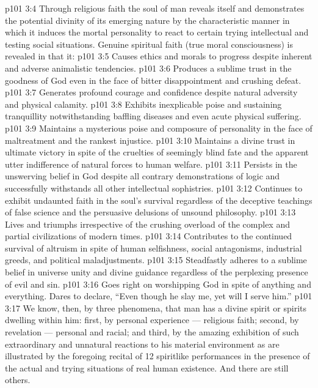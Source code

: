 \vs p101 3:4 Through religious faith the soul of man reveals itself and demonstrates the potential divinity of its emerging nature by the characteristic manner in which it induces the mortal personality to react to certain trying intellectual and testing social situations. Genuine spiritual faith (true moral consciousness) is revealed in that it:
\vs p101 3:5 \bibnobreakspace Causes ethics and morals to progress despite inherent and adverse animalistic tendencies.
\vs p101 3:6 \bibnobreakspace Produces a sublime trust in the goodness of God even in the face of bitter disappointment and crushing defeat.
\vs p101 3:7 \bibnobreakspace Generates profound courage and confidence despite natural adversity and physical calamity.
\vs p101 3:8 \bibnobreakspace Exhibits inexplicable poise and sustaining tranquillity notwithstanding baffling diseases and even acute physical suffering.
\vs p101 3:9 \bibnobreakspace Maintains a mysterious poise and composure of personality in the face of maltreatment and the rankest injustice.
\vs p101 3:10 \bibnobreakspace Maintains a divine trust in ultimate victory in spite of the cruelties of seemingly blind fate and the apparent utter indifference of natural forces to human welfare.
\vs p101 3:11 \bibnobreakspace Persists in the unswerving belief in God despite all contrary demonstrations of logic and successfully withstands all other intellectual sophistries.
\vs p101 3:12 \bibnobreakspace Continues to exhibit undaunted faith in the soul’s survival regardless of the deceptive teachings of false science and the persuasive delusions of unsound philosophy.
\vs p101 3:13 \bibnobreakspace Lives and triumphs irrespective of the crushing overload of the complex and partial civilizations of modern times.
\vs p101 3:14 \bibnobreakspace Contributes to the continued survival of altruism in spite of human selfishness, social antagonisms, industrial greeds, and political maladjustments.
\vs p101 3:15 \bibnobreakspace Steadfastly adheres to a sublime belief in universe unity and divine guidance regardless of the perplexing presence of evil and sin.
\vs p101 3:16 \bibnobreakspace Goes right on worshipping God in spite of anything and everything. Dares to declare, “Even though he slay me, yet will I serve him.”
\vs p101 3:17 \pc We know, then, by three phenomena, that man has a divine spirit or spirits dwelling within him: first, by personal experience --- religious faith; second, by revelation --- personal and racial; and third, by the amazing exhibition of such extraordinary and unnatural reactions to his material environment as are illustrated by the foregoing recital of 12 spiritlike performances in the presence of the actual and trying situations of real human existence. And there are still others.
